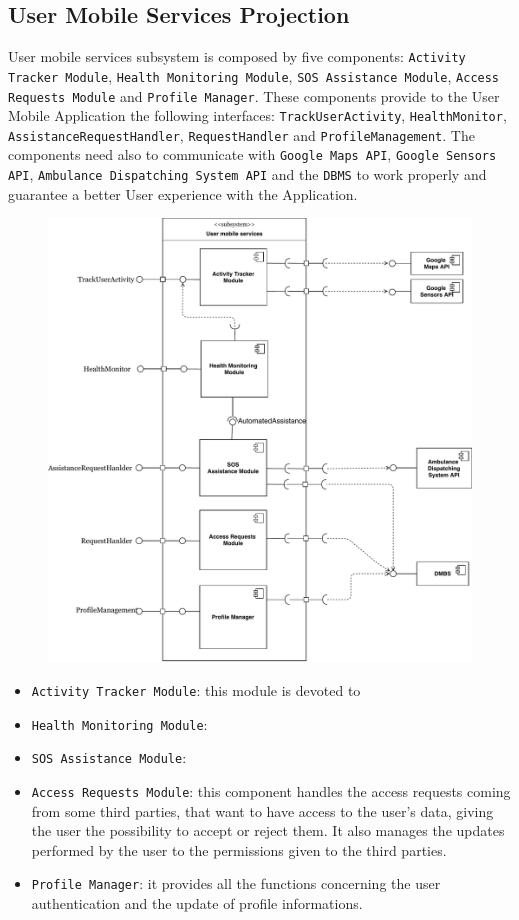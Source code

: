 \documentclass[12pt,a4paper]{article}
\begin{document}
	\newpage
	\subsection{User Mobile Services Projection}
		User mobile services subsystem is composed by five components: \texttt{Activity Tracker Module}, \texttt{Health Monitoring Module}, \texttt{SOS Assistance Module}, \texttt{Access Requests Module} and \texttt{Profile Manager}. These components provide to the User Mobile Application the following interfaces: \texttt{TrackUserActivity}, \texttt{HealthMonitor}, \texttt{AssistanceRequestHandler}, \texttt{RequestHandler} and \texttt{ProfileManagement}. The components need also to communicate with \texttt{Google Maps API}, \texttt{Google Sensors API}, \texttt{Ambulance Dispatching System API} and the \texttt{DBMS} to work properly and guarantee a better User experience with the Application. 
		\begin{figure}[H]
			\centering
			\includegraphics[height=1.05\linewidth]{images/user_projection}
			\label{fig:user_projection}
		\end{figure}
		\begin{itemize}
			\item \texttt{Activity Tracker Module}: this module is devoted to
			\item \texttt{Health Monitoring Module}: 
			\item \texttt{SOS Assistance Module}: 
			\item \texttt{Access Requests Module}: this component handles the access requests coming from some third parties, that want to have access to the user's data, giving the user the possibility to accept or reject them. It also manages the updates performed by the user to the permissions given to the third parties.
			\item \texttt{Profile Manager}: it provides all the functions concerning the user authentication and the update of profile informations.
		\end{itemize}
	
\end{document}
